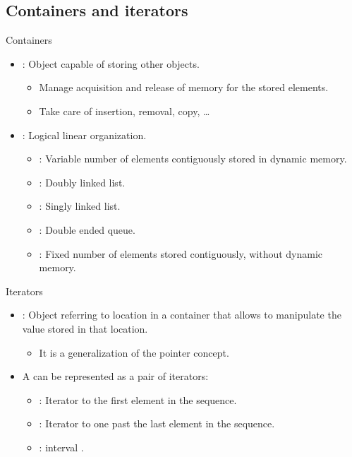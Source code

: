 \subsection{Containers and iterators}

\begin{frame}[t,fragile]{Containers}
\begin{itemize}
  \item {}: 
        Object capable of storing other objects.
    \begin{itemize}
      \item Manage acquisition and release of memory for the stored elements.
      \item Take care of insertion, removal, copy, \ldots
    \end{itemize}

  \item {}: Logical linear organization.
    \begin{itemize}
      \item {}: 
            Variable number of elements contiguously stored in dynamic memory.
      \item {}: 
            Doubly linked list.
      \item {}: 
            Singly linked list.
      \item {}: 
            Double ended queue.
      \item {}: 
            Fixed number of elements stored contiguously, without dynamic memory.
    \end{itemize}
\end{itemize}
\end{frame}

\begin{frame}[t,fragile]{Iterators}
\begin{itemize}
  \item {}: 
        Object referring to location in a container that allows to manipulate
        the value stored in that location.
    \begin{itemize}
      \item It is a generalization of the pointer concept.
    \end{itemize}

  \item A  can be represented as a pair of iterators:
    \begin{itemize}
      \item {}: 
            Iterator to the first element in the sequence.
      \item {}: 
            Iterator to one past the last element in the sequence.
      \item {}:  interval
            \textgood{[first,last)}.
    \end{itemize}

\end{itemize}
\end{frame}

